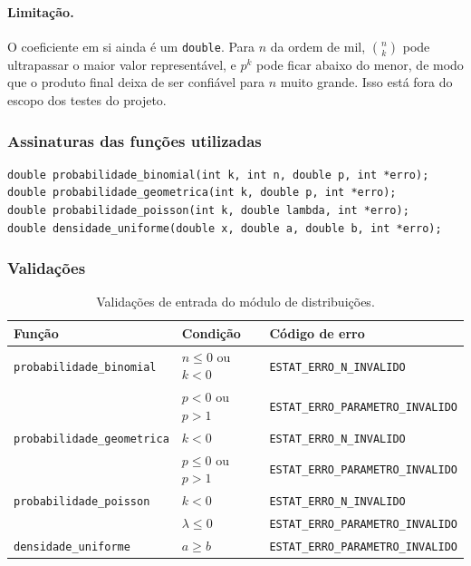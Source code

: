 \documentclass[12pt,a4paper]{article}
\newcommand{\cod}[1]{\texttt{#1}}
\begin{document}
\paragraph{Limitação.} O coeficiente em si ainda é um \cod{double}. Para $n$ da
ordem de mil, $\binom{n}{k}$ pode ultrapassar o maior valor representável, e
$p^k$ pode ficar abaixo do menor, de modo que o produto final deixa de ser
confiável para $n$ muito grande. Isso está fora do escopo dos testes do
projeto.
 
\subsubsection{Assinaturas das funções utilizadas}
\begin{lstlisting}
double probabilidade_binomial(int k, int n, double p, int *erro);
double probabilidade_geometrica(int k, double p, int *erro);
double probabilidade_poisson(int k, double lambda, int *erro);
double densidade_uniforme(double x, double a, double b, int *erro);
\end{lstlisting}
 
\subsubsection{Validações}
\begin{table}[h]
\centering
\small
\begin{tabular}{@{}lll@{}}
\toprule
Função & Condição & Código de erro \\
\midrule
\cod{probabilidade\_binomial}   & $n \le 0$ ou $k < 0$  & \cod{ESTAT\_ERRO\_N\_INVALIDO} \\
                                & $p < 0$ ou $p > 1$    & \cod{ESTAT\_ERRO\_PARAMETRO\_INVALIDO} \\
\cod{probabilidade\_geometrica} & $k < 0$               & \cod{ESTAT\_ERRO\_N\_INVALIDO} \\
                                & $p \le 0$ ou $p > 1$  & \cod{ESTAT\_ERRO\_PARAMETRO\_INVALIDO} \\
\cod{probabilidade\_poisson}    & $k < 0$               & \cod{ESTAT\_ERRO\_N\_INVALIDO} \\
                                & $\lambda \le 0$       & \cod{ESTAT\_ERRO\_PARAMETRO\_INVALIDO} \\
\cod{densidade\_uniforme}       & $a \ge b$             & \cod{ESTAT\_ERRO\_PARAMETRO\_INVALIDO} \\
\bottomrule
\end{tabular}
\caption{Validações de entrada do módulo de distribuições.}
\end{table}
 
\end{document}
